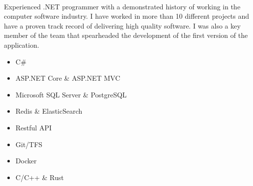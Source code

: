 \documentclass[a4paper]{developercv} %
\begin{document}
\vspace{0.5cm}


\begin{minipage}[t]{0.5\textwidth} %
	\vspace{-\baselineskip} %
	\\\par
	Experienced .NET programmer with a demonstrated history of working in the computer software industry.
	I have worked in more than 10 different projects and have a proven track record of delivering high quality software.
	I was also a key member of the team that spearheaded the development of the first version of the application.
\end{minipage}
\hfill %
\begin{minipage}[t]{0.4\textwidth} %
	\vspace{-\baselineskip} %
	\begin{itemize}[noitemsep]
		\item C\#
		\item ASP.NET Core \& ASP.NET MVC
		\item Microsoft SQL Server \& PostgreSQL
		\item Redis \& ElasticSearch
		\item Restful API
		\item Git/TFS
		\item Docker
		\item C/C++ \& Rust
	\end{itemize}
\end{minipage}

\end{document}
